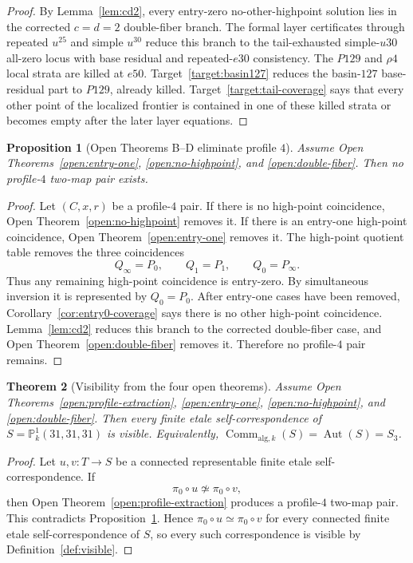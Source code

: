 \documentclass[11pt]{amsart}
\newtheorem{theorem}{Theorem}[section]
\newtheorem{proposition}[theorem]{Proposition}
\newcommand{\PP}{\mathbb P}
\newcommand{\Aut}{\operatorname{Aut}}
\newcommand{\Comm}{\operatorname{Comm}}
\begin{document}
\begin{proof}
By Lemma~\ref{lem:cd2}, every entry-zero no-other-highpoint solution lies in
the corrected \(c=d=2\) double-fiber branch.  The formal layer certificates
through repeated \(u^{25}\) and simple \(u^{30}\) reduce this branch to the
tail-exhausted simple-\(u30\) all-zero locus with base residual and
repeated-\(e30\) consistency.  The \(P129\) and \(\rho4\) local strata are
killed at \(e50\).  Target~\ref{target:basin127} reduces the basin-\(127\)
base-residual part to \(P129\), already killed.  Target~\ref{target:tail-coverage}
says that every other point of the localized frontier is contained in one of
these killed strata or becomes empty after the later layer equations.
\end{proof}

\begin{proposition}[Open Theorems B--D eliminate profile \(4\)]
\label{prop:BCD-profile4}
Assume Open Theorems~\ref{open:entry-one}, \ref{open:no-highpoint}, and
\ref{open:double-fiber}.  Then no profile-\(4\) two-map pair exists.
\end{proposition}

\begin{proof}
Let \((C,x,r)\) be a profile-\(4\) pair.  If there is no high-point
coincidence, Open Theorem~\ref{open:no-highpoint} removes it.  If there is an
entry-one high-point coincidence, Open Theorem~\ref{open:entry-one} removes it.  The
high-point quotient table removes the three coincidences
\[
  Q_\infty=P_0,\qquad Q_1=P_1,\qquad Q_0=P_\infty.
\]
Thus any remaining high-point coincidence is entry-zero.  By simultaneous
inversion it is represented by \(Q_0=P_0\).  After entry-one cases have been
removed, Corollary~\ref{cor:entry0-coverage} says there is no other high-point
coincidence.  Lemma~\ref{lem:cd2} reduces this branch to the corrected
double-fiber case, and Open Theorem~\ref{open:double-fiber} removes it.
Therefore no profile-\(4\) pair remains.
\end{proof}

\begin{theorem}[Visibility from the four open theorems]
\label{thm:four-open-imply-comm}
Assume Open Theorems~\ref{open:profile-extraction}, \ref{open:entry-one},
\ref{open:no-highpoint}, and \ref{open:double-fiber}.  Then every finite
etale self-correspondence of \(S=\PP^1_k(31,31,31)\) is visible.  Equivalently,
\(\Comm_{\mathrm{alg},k}(S)=\Aut(S)=S_3\).
\end{theorem}

\begin{proof}
Let \(u,v:T\to S\) be a connected representable finite etale
self-correspondence.  If
\[
  \pi_0\circ u\not\simeq \pi_0\circ v,
\]
then Open Theorem~\ref{open:profile-extraction} produces a profile-\(4\)
two-map pair.  This contradicts Proposition~\ref{prop:BCD-profile4}.  Hence
\(\pi_0\circ u\simeq\pi_0\circ v\) for every connected finite etale
self-correspondence of \(S\), so every such correspondence is visible by
Definition~\ref{def:visible}.
\end{proof}
\end{document}
